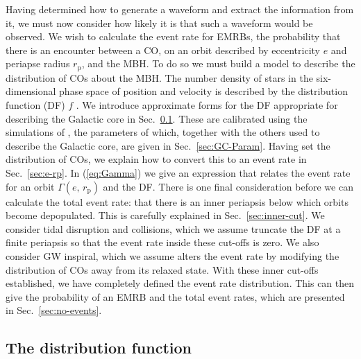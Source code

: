 \documentclass[useAMS,usedcolumn,usegraphicx,usenatbib]{mn2e}
\newcommand{\eqnref}[1]{(\ref{eq:#1})}
\newcommand{\secref}[1]{Sec.~\ref{sec:#1}}
\newcommand{\sub}[1]{\ensuremath{_\mathrm{#1}}}
\begin{document}
Having determined how to generate a waveform and extract the information from it, we must now consider how likely it is that such a waveform would be observed. We wish to calculate the event rate for EMRBs, the probability that there is an encounter between a CO, on an orbit described by eccentricity $e$ and periapse radius $r\sub{p}$, and the MBH. To do so we must build a model to describe the distribution of COs about the MBH. The number density of stars in the six-dimensional phase space of position and velocity is described by the distribution function (DF) $f$ \citep[section 4.1]{Binney2008}. We introduce approximate forms for the DF appropriate for describing the Galactic core in \secref{DF}. These are calibrated using the simulations of \citet{Alexander2009}, the parameters of which, together with the others used to describe the Galactic core, are given in \secref{GC-Param}. Having set the distribution of COs, we explain how to convert this to an event rate in \secref{e-rp}. In \eqnref{Gamma} we give an expression that relates the event rate for an orbit $\Gamma(e,\,r\sub{p})$ and the DF. There is one final consideration before we can calculate the total event rate: that there is an inner periapsis below which orbits become depopulated. This is carefully explained in \secref{inner-cut}. We consider tidal disruption and collisions, which we assume truncate the DF at a finite periapsis so that the event rate inside these cut-offs is zero. We also consider GW inspiral, which we assume alters the event rate by modifying the distribution of COs away from its relaxed state. With these inner cut-offs established, we have completely defined the event rate distribution. This can then give the probability of an EMRB and the total event rates, which are presented in \secref{no-events}.

\subsection{The distribution function}\label{sec:DF}
\end{document}
